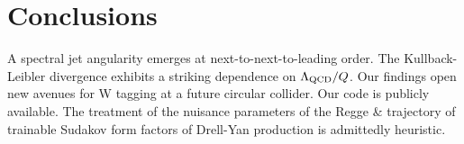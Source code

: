 \section{Conclusions}\label{sec:conclusions}

A spectral jet angularity emerges at next-to-next-to-leading order. The
Kullback-Leibler divergence exhibits a striking dependence on
$\Lambda_{\rm QCD}/Q$. Our findings open new avenues for W tagging at a
future circular collider. Our code is publicly available. The treatment
of the nuisance parameters of the Regge & trajectory of trainable Sudakov
form factors of Drell-Yan production is admittedly heuristic.

